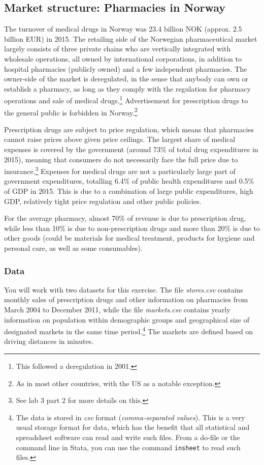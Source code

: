 \documentclass[12pt,a4paper]{article}
\begin{document}
\subsection*{Market structure: Pharmacies in Norway}
The turnover of medical drugs in Norway was 23.4 billion NOK (approx. 2.5 billion EUR) in 2015. The retailing side of the Norwegian pharmaceutical market largely consists of three private chains who are vertically integrated with wholesale operations, all owned by international corporations, in addition to hospital pharmacies (publicly owned) and a few independent pharmacies. The owner-side of the market is deregulated, in the sense that anybody can own or establish a pharmacy, as long as they comply with the regulation for pharmacy operations and sale of medical drugs.\footnote{This followed a deregulation in 2001.} Advertisement for prescription drugs to the general public is forbidden in Norway.\footnote{As in most other countries, with the US as a notable exception.}

Prescription drugs are subject to price regulation, which means that pharmacies cannot raise prices above given price ceilings. The largest share of medical expenses is covered by the government (around 73\% of total drug expenditures in 2015), meaning that consumers do not necessarily face the full price due to insurance.\footnote{See lab 3 part 2 for more details on this.} Expenses for medical drugs are not a particularly large part of government expenditures, totalling 6.4\% of public health expenditures and 0.5\% of GDP in 2015. This is due to a combination of large public expenditures, high GDP, relatively tight price regulation and other public policies.

For the average pharmacy, almost 70\% of revenue is due to prescription drug, while less than 10\% is due to non-prescription drugs and more than 20\% is due to other goods (could be materials for medical treatment, products for hygiene and personal care, as well as some consumables).

\pagebreak

\subsubsection*{Data}
You will work with two datasets for this exercise. The file \emph{stores.csv} contains monthly sales of prescription drugs and other information on pharmacies from March 2004 to December 2011, while the file \emph{markets.csv} contains yearly information on population within demographic groups and geographical size of designated markets in the same time period.\footnote{The data is stored in \emph{csv} format (\emph{comma-separated values}). This is a very usual storage format for data, which has the benefit that all statistical and spreadsheet software can read and write such files. From a do-file or the command line in Stata, you can use the command \texttt{insheet} to read such files.} The markets are defined based on driving distances in minutes.
\end{document}
